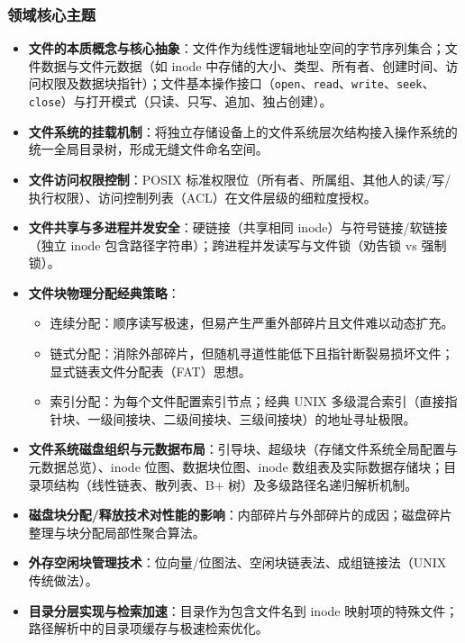 \subsubsection{领域核心主题}
\begin{itemize}\setlength{\itemsep}{0pt}\setlength{\parskip}{0pt}
    \item \textbf{文件的本质概念与核心抽象}：文件作为线性逻辑地址空间的字节序列集合；文件数据与文件元数据（如 inode 中存储的大小、类型、所有者、创建时间、访问权限及数据块指针）；文件基本操作接口（\texttt{open}、\texttt{read}、\texttt{write}、\texttt{seek}、\texttt{close}）与打开模式（只读、只写、追加、独占创建）。
    \item \textbf{文件系统的挂载机制}：将独立存储设备上的文件系统层次结构接入操作系统的统一全局目录树，形成无缝文件命名空间。
    \item \textbf{文件访问权限控制}：POSIX 标准权限位（所有者、所属组、其他人的读/写/执行权限）、访问控制列表（ACL）在文件层级的细粒度授权。
    \item \textbf{文件共享与多进程并发安全}：硬链接（共享相同 inode）与符号链接/软链接（独立 inode 包含路径字符串）；跨进程并发读写与文件锁（劝告锁 vs 强制锁）。
    \item \textbf{文件块物理分配经典策略}：
    \begin{itemize}\setlength{\itemsep}{0pt}\setlength{\parskip}{0pt}
        \item 连续分配：顺序读写极速，但易产生严重外部碎片且文件难以动态扩充。
        \item 链式分配：消除外部碎片，但随机寻道性能低下且指针断裂易损坏文件；显式链表文件分配表（FAT）思想。
        \item 索引分配：为每个文件配置索引节点；经典 UNIX 多级混合索引（直接指针块、一级间接块、二级间接块、三级间接块）的地址寻址极限。
    \end{itemize}
    \item \textbf{文件系统磁盘组织与元数据布局}：引导块、超级块（存储文件系统全局配置与元数据总览）、inode 位图、数据块位图、inode 数组表及实际数据存储块；目录项结构（线性链表、散列表、B+ 树）及多级路径名递归解析机制。
    \item \textbf{磁盘块分配/释放技术对性能的影响}：内部碎片与外部碎片的成因；磁盘碎片整理与块分配局部性聚合算法。
    \item \textbf{外存空闲块管理技术}：位向量/位图法、空闲块链表法、成组链接法（UNIX 传统做法）。
    \item \textbf{目录分层实现与检索加速}：目录作为包含文件名到 inode 映射项的特殊文件；路径解析中的目录项缓存与极速检索优化。
\end{itemize}

